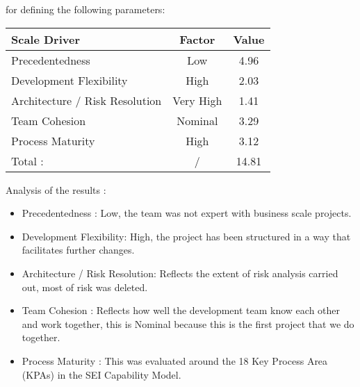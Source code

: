 \documentclass[11pt, a4paper,titlepage]{article}
\begin{document}
		for defining the following parameters: 
		\newline
		\newline
		\begin{tabularx}{\textwidth}{|X|c|c|}
			\hline
			\textbf{Scale Driver} &	\textbf{Factor} & \textbf{Value} \\
			\hline Precedentedness & Low &	4.96  \\
			 Development Flexibility & High & 2.03\\	
			 Architecture / Risk Resolution & Very High & 1.41\\
			 Team Cohesion & Nominal & 3.29\\
			 Process Maturity & High & 3.12\\
			\hline Total : & / & 14.81 \\
			\hline
		\end{tabularx}
		\newline\newline\newline
		Analysis of the results :
		\begin{itemize}
			\item Precedentedness : Low, the team was not expert with business scale projects.
			\item Development Flexibility: High, the project has been structured in a way that facilitates further changes.
			\item Architecture / Risk Resolution: Reflects the extent of risk analysis carried out, most of risk was deleted.
			\item Team Cohesion : Reflects how well the development team know each other and work together, this is Nominal because this is the first project that we do together.
			\item Process Maturity : This was evaluated around the 18 Key Process Area (KPAs) in the SEI Capability
			Model.
		\end{itemize}
	
\end{document}
